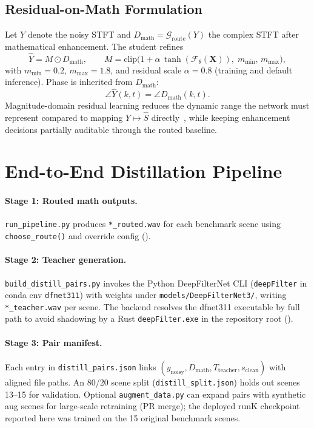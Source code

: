 \subsection{Residual-on-Math Formulation}

Let $Y$ denote the noisy STFT and $D_{\mathrm{math}}=\mathcal{G}_{\mathrm{route}}(Y)$ the complex STFT after mathematical enhancement. The student refines
\begin{equation}
  \hat{Y} = M \odot D_{\mathrm{math}}, \qquad
  M = \mathrm{clip}\bigl(1 + \alpha\,\tanh(\mathcal{F}_\theta(\mathbf{X})),\; m_{\min},\, m_{\max}\bigr),
  \label{eq:residual_mask}
\end{equation}
with $m_{\min}=0.2$, $m_{\max}=1.8$, and residual scale $\alpha=0.8$ (training and default inference). Phase is inherited from $D_{\mathrm{math}}$:
\begin{equation}
  \angle \hat{Y}(k,t) = \angle D_{\mathrm{math}}(k,t).
\end{equation}
Magnitude-domain residual learning reduces the dynamic range the network must represent compared to mapping $Y\mapsto \hat{S}$ directly~\cite{hintondistill2015}, while keeping enhancement decisions partially auditable through the routed baseline.

\section{End-to-End Distillation Pipeline}
\label{sec:distill_pipeline}

\paragraph{Stage 1: Routed math outputs.}
\texttt{run\_pipeline.py} produces \texttt{*\_routed.wav} for each benchmark scene using \texttt{choose\_route()} and override config ().

\paragraph{Stage 2: Teacher generation.}
\texttt{build\_distill\_pairs.py} invokes the Python DeepFilterNet CLI (\texttt{deepFilter} in conda env \texttt{dfnet311}) with weights under \texttt{models/DeepFilterNet3/}, writing \texttt{*\_teacher.wav} per scene. The backend resolves the dfnet311 executable by full path to avoid shadowing by a Rust \texttt{deepFilter.exe} in the repository root ().

\paragraph{Stage 3: Pair manifest.}
Each entry in \texttt{distill\_pairs.json} links $(y_{\mathrm{noisy}}, D_{\mathrm{math}}, T_{\mathrm{teacher}}, s_{\mathrm{clean}})$ with aligned file paths. An 80/20 scene split (\texttt{distill\_split.json}) holds out scenes 13--15 for validation. Optional \texttt{augment\_data.py} can expand pairs with synthetic aug scenes for large-scale retraining (PR merge); the deployed runK checkpoint reported here was trained on the 15 original benchmark scenes.


